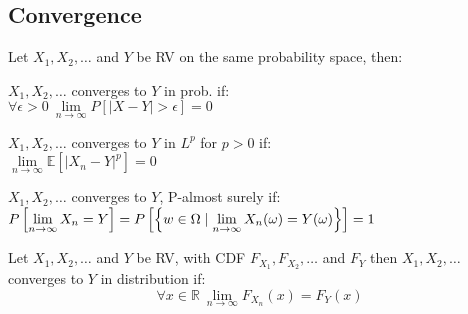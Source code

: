 \documentclass[8pt,a4paper]{extarticle}     %
\newcommand{\R}{\mathbb{R}}
\newcommand{\colnull}{\vfill\null\columnbreak}
\newcommand{\limcont}[3]{\lim\limits_{#1 \rightarrow #2}{#3}}
\begin{document}
\begin{multicols}{4}
\subsection{Convergence}
\begin{boxdefinition} 
	Let $X_1,X_2,\dots$ and $Y$ be RV on the same probability space, then:
	\begin{listnr}
		\item $X_1,X_2,\dots$ converges to $Y$ in prob. if: \\[0.8em] 
		$\displaystyle \forall \epsilon>0 \ \limcont{n}{\infty}{P\left[\left\lvert X-Y\right\rvert >\epsilon\right]}=0$
		\item $X_1,X_2,\dots$ converges to $Y$ in $L^p$ for $p>0$ if:\\[0.8em] 
		$\displaystyle \limcont{n}{\infty}{\mathbb{E}\left[\left\lvert X_n- Y\right\rvert^p\right]}=0$
		\item $X_1,X_2,\dots$ converges to $Y$, P-almost surely if:\\[0.8em] 
		$\displaystyle P\left[\limcont{n}{\infty}{X_n}= Y\right]=\\P\left[\left\{w\in\Omega \mid \limcont{n}{\infty}{X_n(\omega)}=Y(\omega)\right\}\right]=1$ 
	\end{listnr}
\end{boxdefinition}
\begin{boxdefinition} 
	Let $X_1,X_2,\dots$ and $Y$ be RV, with CDF $F_{X_1}, F_{X_2},\dots$ and $F_Y$ then $X_1,X_2,\dots$ converges to $Y$ in distribution if: 
	\[
		\forall x\in\R \ \limcont{n}{\infty}{F_{X_n}}(x)=F_Y(x)
	\]
\end{boxdefinition}
\colnull 

\end{multicols}
\end{document}

